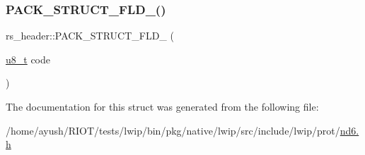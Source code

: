 \mbox{\label{structrs__header_af17d7ef3813c8b32b7d4ba2bdb953e74}} 
\subsubsection{\texorpdfstring{P\+A\+C\+K\+\_\+\+S\+T\+R\+U\+C\+T\+\_\+\+F\+L\+D\+\_()}{PACK\_STRUCT\_FLD\_8()}\hspace{0.1cm}{\footnotesize\ttfamily [4/4]}}
{\footnotesize\ttfamily rs\+\_\+header\+::\+P\+A\+C\+K\+\_\+\+S\+T\+R\+U\+C\+T\+\_\+\+F\+L\+D\+\_ (\begin{DoxyParamCaption}\item[{\hyperlink{group__compiler__abstraction_ga4caecabca98b43919dd11be1c0d4cd8e}{u8\+\_\+t}}]{code }\end{DoxyParamCaption})}



The documentation for this struct was generated from the following file\+:\begin{DoxyCompactItemize}
\item 
/home/ayush/\+R\+I\+O\+T/tests/lwip/bin/pkg/native/lwip/src/include/lwip/prot/\hyperlink{native_2lwip_2src_2include_2lwip_2prot_2nd6_8h}{nd6.\+h}\end{DoxyCompactItemize}
